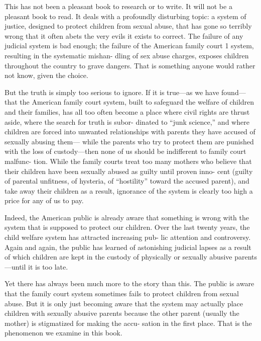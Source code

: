 \pfl{}

This has not been a pleasant book to research or to write. It will not be
a pleasant book to read. It deals with a profoundly disturbing topic: a
system of justice, designed to protect children from sexual abuse, that
has gone so terribly wrong that it often abets the very evils it exists to
correct. The failure of any judicial system is bad enough; the failure of
the American family court 1 system, resulting in the systematic mishan-
dling of sex abuse charges, exposes children throughout the country to
grave dangers. That is something anyone would rather not know, given
the choice. \pfl{}


But the truth is simply too serious to ignore. If it is true—as we have
found—that the American family court system, built to safeguard the
welfare of children and their families, has all too often become a place
where civil rights are thrust aside, where the search for truth is subor-
dinated to “junk science,” and where children are forced into unwanted
relationships with parents they have accused of sexually abusing them—
while the parents who try to protect them are punished with the loss of
custody—then none of us should be indifferent to family court malfunc-
tion. While the family courts treat too many mothers who believe that
their children have been sexually abused as guilty until proven inno-
cent (guilty of parental unfitness, of hysteria, of “hostility” toward the
accused parent), and take away their children as a result, ignorance of
the system is clearly too high a price for any of us to pay. \pfl{}


Indeed, the American public is already aware that something is wrong
with the system that is supposed to protect our children. Over the last
twenty years, the child welfare system has attracted increasing pub-
lic attention and controversy. Again and again, the public has learned
of astonishing judicial lapses as a result of which children are kept in
the custody of physically or sexually abusive parents—until it is too
late. \pfl{}


Yet there has always been much more to the story than this. The public
is aware that the family court system sometimes fails to protect children
from sexual abuse. But it is only just becoming aware that the system
may actually place children with sexually abusive parents because the
other parent (usually the mother) is stigmatized for making the accu-
sation in the first place. That is the phenomenon we examine in this
book. \pfl{}


